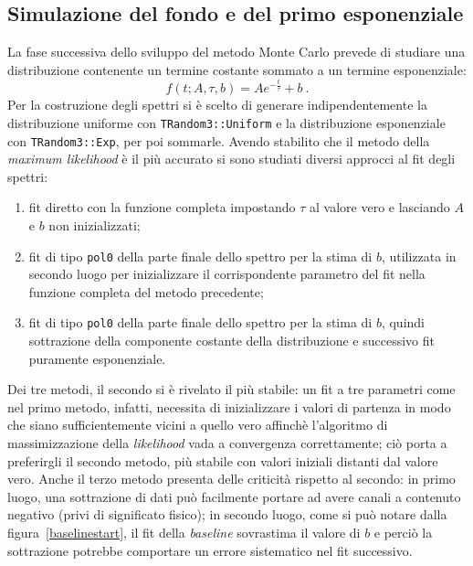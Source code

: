 \documentclass[10pt, oneside, a4paper]{article}   	%
\begin{document}
\subsection{Simulazione del fondo e del primo esponenziale} \label{bexp}
La fase successiva dello sviluppo del metodo Monte Carlo prevede di studiare una distribuzione contenente un termine costante sommato a un termine esponenziale: 
\begin{equation}
 f(t;A,\tau,b)=Ae^{-\frac{t}{\tau}}+b \ .
 \label{eq::exp_plus_base}
\end{equation}
Per la costruzione degli spettri si è scelto di generare indipendentemente la distribuzione uniforme con \lstinline{TRandom3::Uniform} e la distribuzione esponenziale con \lstinline{TRandom3::Exp}, per poi sommarle. Avendo stabilito che il metodo della \textit{maximum likelihood} è il più accurato si sono studiati diversi approcci al fit degli spettri:
\begin{enumerate}
  \item fit diretto con la funzione completa impostando $\tau$ al valore vero e lasciando $A$ e $b$ non inizializzati;
  \item fit di tipo \lstinline{pol0} della parte finale dello spettro per la stima di $b$, utilizzata in secondo luogo per inizializzare il corrispondente parametro del fit nella funzione completa del metodo precedente;
  \item fit di tipo \lstinline{pol0} della parte finale dello spettro per la stima di $b$, quindi sottrazione della componente costante della distribuzione e successivo fit puramente esponenziale.
\end{enumerate}
Dei tre metodi, il secondo si è rivelato il più stabile: un fit a tre parametri come nel primo metodo, infatti, necessita di inizializzare i valori di partenza in modo che siano sufficientemente vicini a quello vero affinchè l'algoritmo di massimizzazione della \textit{likelihood} vada a convergenza correttamente; ciò porta a preferirgli il secondo metodo, più stabile con valori iniziali distanti dal valore vero. Anche il terzo metodo presenta delle criticità rispetto al secondo: in primo luogo, una sottrazione di dati può facilmente portare ad avere canali a contenuto negativo (privi di significato fisico); in secondo luogo, come si può notare dalla figura~\ref{baselinestart}, il fit della \textit{baseline} sovrastima il valore di $b$ e perciò la sottrazione potrebbe comportare un errore sistematico nel fit successivo.
\end{document}
